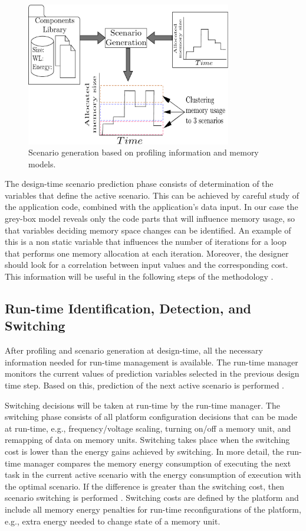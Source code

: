 \begin{figure}[!t]
\centering
\includegraphics[width=0.8\textwidth]{A/clustering_v2-eps-converted-to.pdf}
\caption{Scenario generation based on profiling information and memory models.}
\label{fig:clusteringA}
\end{figure}

The design-time scenario prediction phase consists of determination of the variables that define the active scenario. This can be achieved by careful study of the application code, combined with the application's data input. In our case the grey-box model reveals only the code parts that will influence memory usage, so that variables deciding memory space changes can be identified. An example of this is a non static variable that influences the number of iterations for a loop that performs one memory allocation at each iteration. Moreover, the designer should look for a correlation between input values and the corresponding cost. This information will be useful in the following steps of the methodology \cite{tcm}.

\subsection{Run-time Identification, Detection, and Switching}

After profiling and scenario generation at design-time, all the necessary information needed for run-time management is available. The run-time manager monitors the current values of prediction variables selected in the previous design time step. Based on this, prediction of the next active scenario is performed  \cite{tcm}. 

Switching decisions will be taken at run-time by the run-time manager. The switching phase consists of all platform configuration decisions that can be made at run-time, e.g., frequency/voltage scaling, turning on/off a memory unit, and remapping of data on memory units. Switching takes place when the switching cost is lower than the energy gains achieved by switching. In more detail, the run-time manager compares the memory energy consumption of executing the next task in the current active scenario with the energy consumption of execution with the optimal scenario. If the difference is greater than the switching cost, then scenario switching is performed \cite{tcm}. Switching costs are defined by the platform and include all memory energy penalties for run-time reconfigurations of the platform, e.g., extra energy needed to change state of a memory unit.

